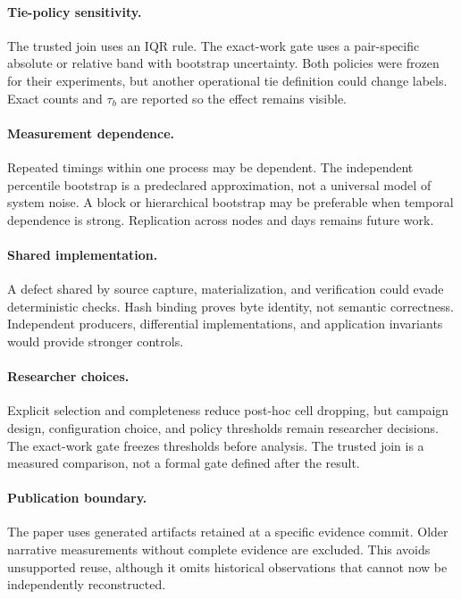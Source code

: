 \documentclass[10pt,twocolumn]{article}
\begin{document}
\paragraph{Tie-policy sensitivity.} The trusted join uses an IQR rule. The
exact-work gate uses a pair-specific absolute or relative band with bootstrap
uncertainty. Both policies were frozen for their experiments, but another
operational tie definition could change labels. Exact counts and $\tau_b$ are
reported so the effect remains visible.

\paragraph{Measurement dependence.} Repeated timings within one process may be
dependent. The independent percentile bootstrap is a predeclared approximation,
not a universal model of system noise. A block or hierarchical bootstrap may
be preferable when temporal dependence is strong. Replication across nodes and
days remains future work.

\paragraph{Shared implementation.} A defect shared by source capture,
materialization, and verification could evade deterministic checks. Hash
binding proves byte identity, not semantic correctness. Independent producers,
differential implementations, and application invariants would provide
stronger controls.

\paragraph{Researcher choices.} Explicit selection and completeness reduce
post-hoc cell dropping, but campaign design, configuration choice, and policy
thresholds remain researcher decisions. The exact-work gate freezes thresholds
before analysis. The trusted join is a measured comparison, not a formal gate
defined after the result.

\paragraph{Publication boundary.} The paper uses generated artifacts retained
at a specific evidence commit. Older narrative measurements without complete
evidence are excluded. This avoids unsupported reuse, although it omits
historical observations that cannot now be independently reconstructed.
\end{document}
